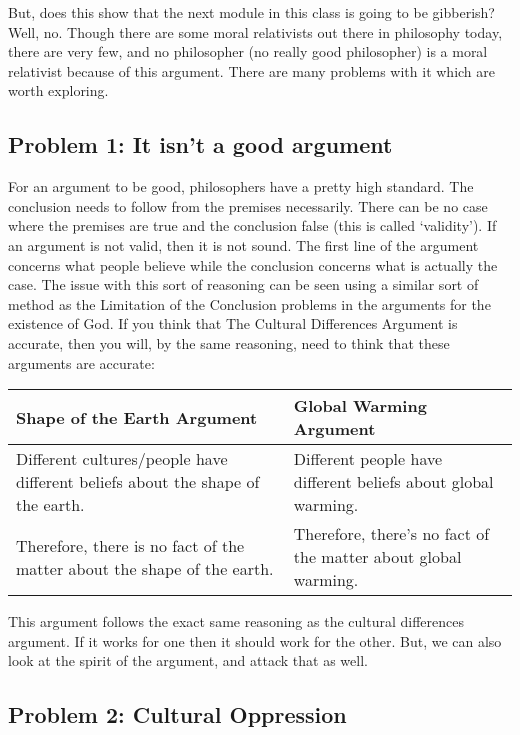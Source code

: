 But, does this show that the next module in this class is going to be gibberish? Well, no. Though there are some moral relativists out there in philosophy today, there are very few, and no philosopher (no really good philosopher) is a moral relativist because of this argument. There are many problems with it which are worth exploring. 

\subsection{Problem 1: It isn't a good argument}

For an argument to be good, philosophers have a pretty high standard. The conclusion needs to follow from the premises necessarily. There can be no case where the premises are true and the conclusion false (this is called ‘validity’). If an argument is not valid, then it is not sound. The first line of the argument concerns what people believe while the conclusion concerns what is actually the case. The issue with this sort of reasoning can be seen using a similar sort of method as the Limitation of the Conclusion problems in the arguments for the existence of God. If you think that The Cultural Differences Argument is accurate, then you will, by the same reasoning, need to think that these arguments are accurate: 
\noindent
\begin{tabular}{p{2.75in}|p{2.75in}}
Shape of the Earth Argument&Global Warming Argument\\\hline
    Different cultures/people have different beliefs about the shape of the earth.& Different people have different beliefs about global warming.\\
    Therefore, there is no fact of the matter about the shape of the earth.&Therefore, there's no fact of the matter about global warming.\\
\end{tabular}

This argument follows the exact same reasoning as the cultural differences argument. If it works for one then it should work for the other. But, we can also look at the spirit of the argument, and attack that as well. 

\subsection{Problem 2: Cultural Oppression}

